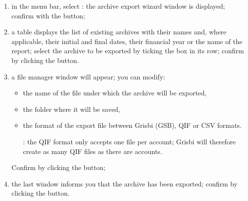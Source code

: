 \begin{enumerate}
	\item in the menu bar, select : the archive export wizard window is displayed; confirm with the  button;
	\item a table displays the list of existing archives with their names and, where applicable, their initial and final dates, their financial year or the name of the report; select the archive to be exported by ticking the box in its row; confirm by clicking the  button.
	\item a file manager window will appear; you can modify:
		\begin{itemize}
			\item the name of the file under which the archive will be exported,
			\item the folder where it will be saved,
			\item the format of the export file between Grisbi (GSB), QIF or CSV formats.
			
			\Note{}: the QIF format only accepts one file per account; Grisbi will therefore create as many QIF files as there are accounts.
		\end{itemize}   
	Confirm by clicking the  button;
	\item the last window informs you that the archive has been exported; confirm by clicking the  button.
\end{enumerate}
